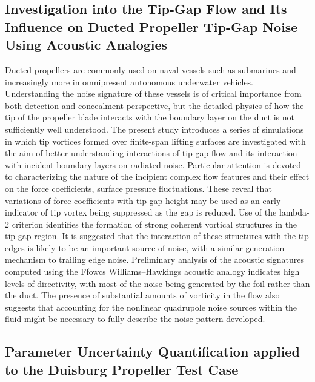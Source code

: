\documentclass[a4paper,10pt]{article}
\begin{document}
\subsection{Investigation into the Tip-Gap Flow and Its Influence on Ducted Propeller Tip-Gap Noise Using Acoustic Analogies \cite{Higgens2020}}

	Ducted propellers are commonly used on naval vessels such as submarines and increasingly more in omnipresent autonomous underwater vehicles. Understanding the noise signature of these vessels is of critical importance from both detection and concealment perspective, but the detailed physics of how the tip of the propeller blade interacts with the boundary layer on the duct is not sufficiently well understood. The present study introduces a series of simulations in which tip vortices formed over finite-span lifting surfaces are investigated with the aim of better understanding interactions of tip-gap flow and its interaction with incident boundary layers on radiated noise. Particular attention is devoted to characterizing the nature of the incipient complex flow features and their effect on the force coefficients, surface pressure fluctuations. These reveal that variations of force coefficients with tip-gap height may be used as an early indicator of tip vortex being suppressed as the gap is reduced. Use of the lambda-2 criterion identifies the formation of strong coherent vortical structures in the tip-gap region. It is suggested that the interaction of these structures with the tip edges is likely to be an important source of noise, with a similar generation mechanism to trailing edge noise. Preliminary analysis of the acoustic signatures computed using the Ffowcs Williams–Hawkings acoustic analogy indicates high levels of directivity, with most of the noise being generated by the foil rather than the duct. The presence of substantial amounts of vorticity in the flow also suggests that accounting for the nonlinear quadrupole noise sources within the fluid might be necessary to fully describe the noise pattern developed.

\subsection{Parameter Uncertainty Quantification applied to the Duisburg Propeller Test Case \cite{Katsuno2019}}
\end{document}
